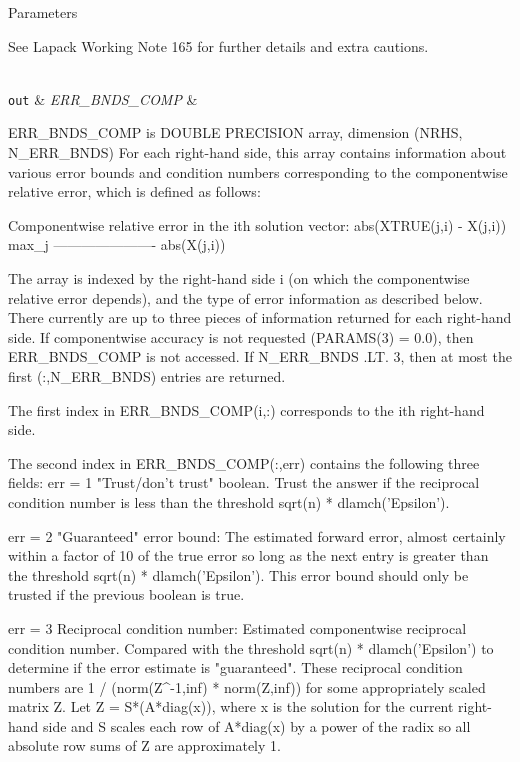 \begin{DoxyParams}[1]{Parameters}
\begin{DoxyVerb}
     See Lapack Working Note 165 for further details and extra
     cautions.\end{DoxyVerb}
\\
\hline
\mbox{\tt out}  & {\em E\+R\+R\+\_\+\+B\+N\+D\+S\+\_\+\+C\+O\+M\+P} & \begin{DoxyVerb}          ERR_BNDS_COMP is DOUBLE PRECISION array, dimension (NRHS, N_ERR_BNDS)
     For each right-hand side, this array contains information about
     various error bounds and condition numbers corresponding to the
     componentwise relative error, which is defined as follows:

     Componentwise relative error in the ith solution vector:
                    abs(XTRUE(j,i) - X(j,i))
             max_j ----------------------
                         abs(X(j,i))

     The array is indexed by the right-hand side i (on which the
     componentwise relative error depends), and the type of error
     information as described below. There currently are up to three
     pieces of information returned for each right-hand side. If
     componentwise accuracy is not requested (PARAMS(3) = 0.0), then
     ERR_BNDS_COMP is not accessed.  If N_ERR_BNDS .LT. 3, then at most
     the first (:,N_ERR_BNDS) entries are returned.

     The first index in ERR_BNDS_COMP(i,:) corresponds to the ith
     right-hand side.

     The second index in ERR_BNDS_COMP(:,err) contains the following
     three fields:
     err = 1 "Trust/don't trust" boolean. Trust the answer if the
              reciprocal condition number is less than the threshold
              sqrt(n) * dlamch('Epsilon').

     err = 2 "Guaranteed" error bound: The estimated forward error,
              almost certainly within a factor of 10 of the true error
              so long as the next entry is greater than the threshold
              sqrt(n) * dlamch('Epsilon'). This error bound should only
              be trusted if the previous boolean is true.

     err = 3  Reciprocal condition number: Estimated componentwise
              reciprocal condition number.  Compared with the threshold
              sqrt(n) * dlamch('Epsilon') to determine if the error
              estimate is "guaranteed". These reciprocal condition
              numbers are 1 / (norm(Z^{-1},inf) * norm(Z,inf)) for some
              appropriately scaled matrix Z.
              Let Z = S*(A*diag(x)), where x is the solution for the
              current right-hand side and S scales each row of
              A*diag(x) by a power of the radix so all absolute row
              sums of Z are approximately 1.


\end{DoxyVerb}
\end{DoxyParams}
